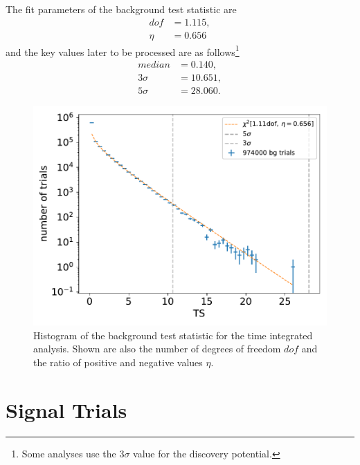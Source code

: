 The fit parameters of the background test statistic are
\begin{align}
  dof &= \num{1.115},\\
  \eta &= \num{0.656}
\end{align}
and the key values later to be processed are as follows\footnote{Some analyses use the $3\sigma$ value for the discovery potential.}
\begin{align}
  median &= \num{0.140},\\
  3\sigma &= \num{10.651},\\
  5\sigma &= \num{28.060}.
\end{align}

\begin{figure}
    \centering
    \includegraphics[width=\linewidth]{Plots/05_csky/9_years_gfu_gold_bg_new.pdf}
    \caption{Histogram of the background test statistic for the time integrated analysis. Shown are also the number of degrees of freedom $dof$ and the ratio of positive and negative values $\eta$.}
    \label{fig:bg_ts_time_int}
\end{figure}

\section{Signal Trials}


